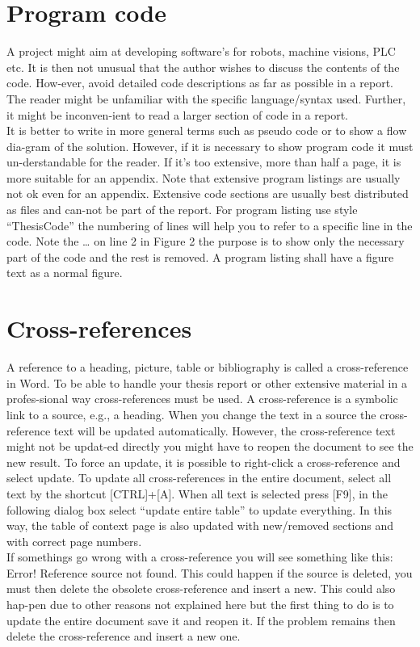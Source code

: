 \section{Program code}
A project might aim at developing software’s for robots, machine visions, PLC etc. It is then not unusual that the author wishes to discuss the contents of the code. How-ever, avoid detailed code descriptions as far as possible in a report. The reader might be unfamiliar with the specific language/syntax used. Further, it might be inconven-ient to read a larger section of code in a report. \\ 
It is better to write in more general terms such as pseudo code or to show a flow dia-gram of the solution. However, if it is necessary to show program code it must un-derstandable for the reader. If it’s too extensive, more than half a page, it is more suitable for an appendix. Note that extensive program listings are usually not ok even for an appendix. Extensive code sections are usually best distributed as files and can-not be part of the report. For program listing use style “ThesisCode” the numbering of lines will help you to refer to a specific line in the code. Note the … on line 2 in Figure 2 the purpose is to show only the necessary part of the code and the rest is removed. A program listing shall have a figure text as a normal figure. 

\begin{comment}
To write notes or comments that isn't published in the pdf.
\end{comment}

\section{Cross-references}
A reference to a heading, picture, table or bibliography is called a cross-reference in Word. To be able to handle your thesis report or other extensive material in a profes-sional way cross-references must be used. A cross-reference is a symbolic link to a source, e.g., a heading. When you change the text in a source the cross-reference text will be updated automatically. However, the cross-reference text might not be updat-ed directly you might have to reopen the document to see the new result. To force an update, it is possible to right-click a cross-reference and select update. To update all cross-references in the entire document, select all text by the shortcut [CTRL]+[A]. When all text is selected press [F9], in the following dialog box select “update entire table” to update everything. In this way, the table of context page is also updated with new/removed sections and with correct page numbers.\\
If somethings go wrong with a cross-reference you will see something like this: Error! Reference source not found. This could happen if the source is deleted, you must then delete the obsolete cross-reference and insert a new. This could also hap-pen due to other reasons not explained here but the first thing to do is to update the entire document save it and reopen it. If the problem remains then delete the cross-reference and insert a new one. 

\begin{comment}
To write notes or comments that isn't published in the pdf.
\end{comment}
